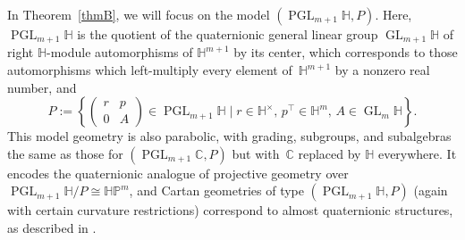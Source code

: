 \documentclass[10pt,a4paper]{amsart}
\numberwithin{equation}{section}
\theoremstyle{definition}
\DeclareMathOperator{\GLin}{\mathrm{GL}}
\DeclareMathOperator{\PGL}{\mathrm{PGL}}
\begin{document}
In Theorem~\ref{thmB}, we will focus on the model $(\PGL_{m+1}\mathbb{H},P)$. Here, $\PGL_{m+1}\mathbb{H}$ is the quotient of the quaternionic general linear group $\GLin_{m+1}\mathbb{H}$ of right $\mathbb{H}$-module automorphisms of $\mathbb{H}^{m+1}$ by its center, which corresponds to those automorphisms which left-multiply every element of~$\mathbb{H}^{m+1}$ by a nonzero real number, and \[P:=\left\{\begin{pmatrix}r & p \\ 0 & A\end{pmatrix}\in\PGL_{m+1}\mathbb{H}\mid r\in\mathbb{H}^\times,\, p^\top\in\mathbb{H}^m,\, A\in\GLin_m\mathbb{H}\right\}.\] This model geometry is also parabolic, with grading, subgroups, and subalgebras the same as those for $(\PGL_{m+1}\mathbb{C},P)$ but with~$\mathbb{C}$ replaced by $\mathbb{H}$ everywhere. It encodes the quaternionic analogue of projective geometry over $\PGL_{m+1}\mathbb{H}/P\cong\mathbb{HP}^m$, and Cartan geometries of type $(\PGL_{m+1}\mathbb{H},P)$ (again with certain curvature restrictions) correspond to almost quaternionic structures, as described in \cite[Proposition~4.1.8]{CapSlovakPG1}.
\end{document}
